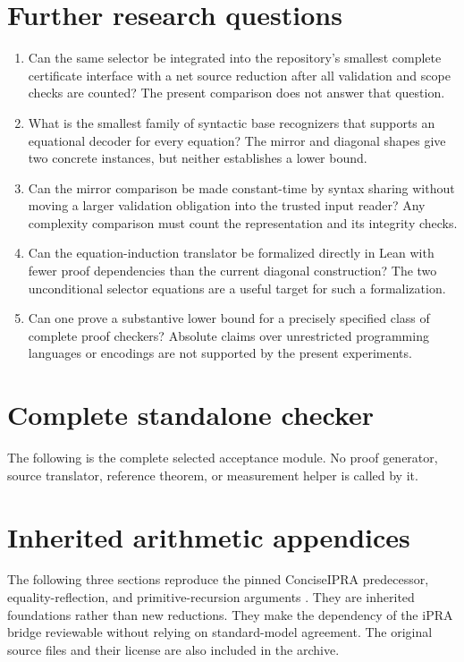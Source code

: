 \documentclass[11pt]{article}
\theoremstyle{definition}\newtheorem{definition}[theorem]{Definition}
\begin{document}
\section{Further research questions}
\begin{enumerate}
\item Can the same selector be integrated into the repository's smallest
complete certificate interface with a net source reduction after all
validation and scope checks are counted? The present comparison does
not answer that question.
\item What is the smallest family of syntactic base recognizers that
supports an equational decoder for every equation? The mirror and
diagonal shapes give two concrete instances, but neither establishes
a lower bound.
\item Can the mirror comparison be made constant-time by syntax sharing
without moving a larger validation obligation into the trusted input
reader? Any complexity comparison must count the representation and
its integrity checks.
\item Can the equation-induction translator be formalized directly in
Lean with fewer proof dependencies than the current diagonal
construction? The two unconditional selector equations are a useful
target for such a formalization.
\item Can one prove a substantive lower bound for a precisely specified
class of complete proof checkers? Absolute claims over unrestricted
programming languages or encodings are not supported by the present
experiments.
\end{enumerate}

\appendix
\section{Complete standalone checker}\label{app:checker}
The following is the complete selected acceptance module. No proof
generator, source translator, reference theorem, or measurement helper
is called by it.

\clearpage
\section*{Inherited arithmetic appendices}
The following three sections reproduce the pinned ConciseIPRA
predecessor, equality-reflection, and primitive-recursion arguments
\cite{erasure,forward,progress}. They are inherited foundations rather
than new reductions. They make the dependency of the iPRA bridge
reviewable without relying on standard-model agreement. The original
source files and their license are also included in the archive.
\end{document}
